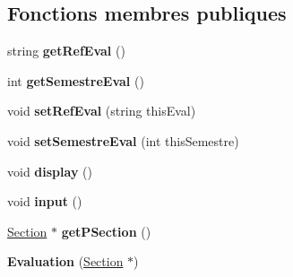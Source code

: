 \subsection*{Fonctions membres publiques}
\begin{DoxyCompactItemize}
\item 
\hypertarget{class_evaluation_a6fbb1585de7c53a1d5a3cff19c1b20c9}{string {\bfseries get\+Ref\+Eval} ()}\label{class_evaluation_a6fbb1585de7c53a1d5a3cff19c1b20c9}

\item 
\hypertarget{class_evaluation_a663623cd21f48ea4815adbe4ff868531}{int {\bfseries get\+Semestre\+Eval} ()}\label{class_evaluation_a663623cd21f48ea4815adbe4ff868531}

\item 
\hypertarget{class_evaluation_ac5a47801531e58bc2621663e7452f1c2}{void {\bfseries set\+Ref\+Eval} (string this\+Eval)}\label{class_evaluation_ac5a47801531e58bc2621663e7452f1c2}

\item 
\hypertarget{class_evaluation_ad22320bf30d0ce0a276c0f1a7cc917e4}{void {\bfseries set\+Semestre\+Eval} (int this\+Semestre)}\label{class_evaluation_ad22320bf30d0ce0a276c0f1a7cc917e4}

\item 
\hypertarget{class_evaluation_a2dfd725e201bf995fac36111ad12d6ac}{void {\bfseries display} ()}\label{class_evaluation_a2dfd725e201bf995fac36111ad12d6ac}

\item 
\hypertarget{class_evaluation_a3599a3e29cf65a30a2deef8d4a0731ca}{void {\bfseries input} ()}\label{class_evaluation_a3599a3e29cf65a30a2deef8d4a0731ca}

\item 
\hypertarget{class_evaluation_a05813c0c8638a54bf524e84566cf3676}{\hyperlink{class_section}{Section} $\ast$ {\bfseries get\+P\+Section} ()}\label{class_evaluation_a05813c0c8638a54bf524e84566cf3676}

\item 
\hypertarget{class_evaluation_a7338edac80f158f18481f965710706bc}{{\bfseries Evaluation} (\hyperlink{class_section}{Section} $\ast$)}\label{class_evaluation_a7338edac80f158f18481f965710706bc}

\end{DoxyCompactItemize}
